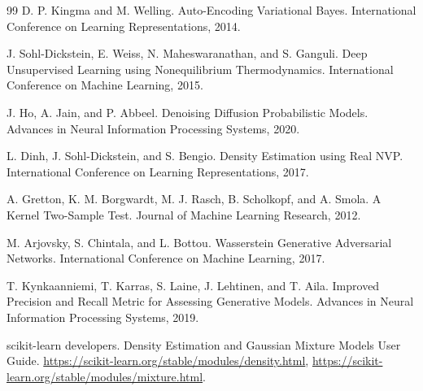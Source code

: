 \documentclass[a4paper,11pt]{article}
\begin{document}
\begin{thebibliography}{99}
D. P. Kingma and M. Welling.
Auto-Encoding Variational Bayes.
International Conference on Learning Representations, 2014.

J. Sohl-Dickstein, E. Weiss, N. Maheswaranathan, and S. Ganguli.
Deep Unsupervised Learning using Nonequilibrium Thermodynamics.
International Conference on Machine Learning, 2015.

J. Ho, A. Jain, and P. Abbeel.
Denoising Diffusion Probabilistic Models.
Advances in Neural Information Processing Systems, 2020.

L. Dinh, J. Sohl-Dickstein, and S. Bengio.
Density Estimation using Real NVP.
International Conference on Learning Representations, 2017.

A. Gretton, K. M. Borgwardt, M. J. Rasch, B. Scholkopf, and A. Smola.
A Kernel Two-Sample Test.
Journal of Machine Learning Research, 2012.

M. Arjovsky, S. Chintala, and L. Bottou.
Wasserstein Generative Adversarial Networks.
International Conference on Machine Learning, 2017.

T. Kynkaanniemi, T. Karras, S. Laine, J. Lehtinen, and T. Aila.
Improved Precision and Recall Metric for Assessing Generative Models.
Advances in Neural Information Processing Systems, 2019.

scikit-learn developers.
Density Estimation and Gaussian Mixture Models User Guide.
\url{https://scikit-learn.org/stable/modules/density.html},
\url{https://scikit-learn.org/stable/modules/mixture.html}.
\end{thebibliography}
\end{document}
